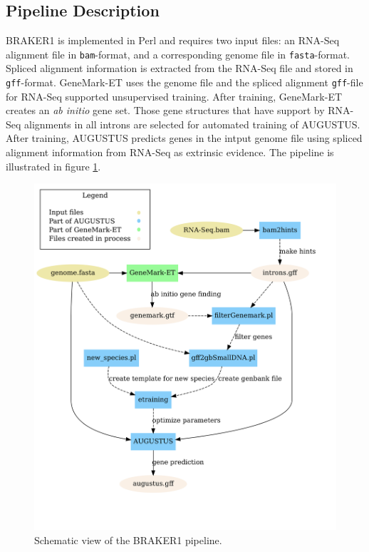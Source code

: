 \documentclass{bioinfo}
\begin{document}
\begin{methods}
\section{Pipeline Description}

BRAKER1 is implemented in Perl and requires two input files: an RNA-Seq alignment file in \texttt{bam}-format, and a corresponding genome file in \texttt{fasta}-format. Spliced alignment information is extracted from the RNA-Seq file and stored in \texttt{gff}-format. GeneMark-ET uses the genome file and  the spliced alignment \texttt{gff}-file for RNA-Seq supported unsupervised training. After training, GeneMark-ET creates an \textit{ab initio} gene set. Those gene structures that have support by RNA-Seq alignments in all introns are selected for automated training of AUGUSTUS. After training, AUGUSTUS predicts genes in the intput genome file using spliced alignment information from RNA-Seq as extrinsic evidence. The pipeline is illustrated in figure \ref{pipeline}.

\begin{figure}[!tpb]%
\centerline{\includegraphics[width=\linewidth]{figs/braker_graph2.png}}
\caption{Schematic view of the BRAKER1 pipeline.}\label{pipeline}
\end{figure}


\end{methods}
\end{document}

